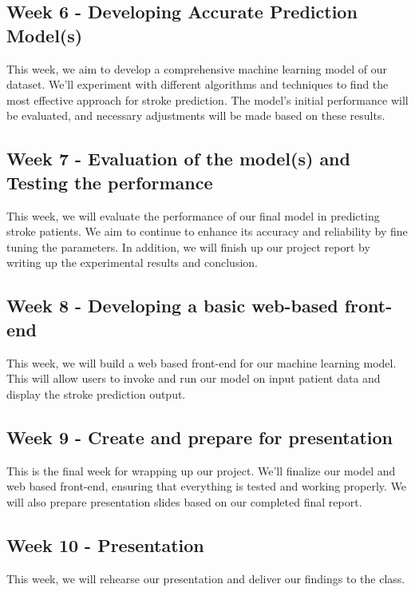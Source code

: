 \documentclass[11pt]{article}
\begin{document}
\subsection*{Week 6 - Developing Accurate Prediction Model(s)}
This week, we aim to develop a comprehensive machine learning model of our dataset. We’ll experiment with different algorithms and techniques to find the most effective approach for stroke prediction. The model’s initial performance will be evaluated, and necessary adjustments will be made based on these results.  

\subsection*{Week 7 - Evaluation of the model(s) and Testing the performance}
This week, we will evaluate the performance of our final model in predicting stroke patients. We aim to continue to enhance its accuracy and reliability by fine tuning the parameters. In addition, we will finish up our project report by writing up the experimental results and conclusion.

\subsection*{Week 8 - Developing a basic web-based front-end }
This week, we will build a web based front-end for our machine learning model. This will allow users to invoke and run our model on input patient data and display the stroke prediction output.

\subsection*{Week 9 - Create and prepare for presentation}
This is the final week for wrapping up our project. We’ll finalize our model and web based front-end, ensuring that everything is tested and working properly. We will also prepare presentation slides based on our completed final report. 

\subsection*{Week 10 - Presentation}
This week, we will rehearse our presentation and deliver our findings to the class.
\end{document}
